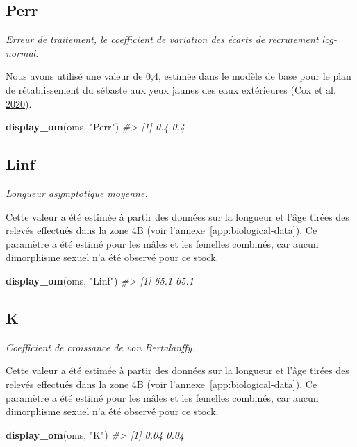\documentclass[11pt]{book}
\newenvironment{Shaded}{\begin{snugshade}}{\end{snugshade}}
\newcommand{\CommentTok}[1]{\textcolor[rgb]{0.56,0.35,0.01}{\textit{#1}}}
\newcommand{\KeywordTok}[1]{\textcolor[rgb]{0.13,0.29,0.53}{\textbf{#1}}}
\newcommand{\NormalTok}[1]{#1}
\newcommand{\StringTok}[1]{\textcolor[rgb]{0.31,0.60,0.02}{#1}}
\begin{document}
\subsection{Perr}

\emph{Erreur de traitement, le coefficient de variation des écarts de recrutement log-normal.}

Nous avons utilisé une valeur de 0,4, estimée dans le modèle de base pour le plan de rétablissement du sébaste aux yeux jaunes des eaux extérieures (Cox et al. \protect\hyperlink{ref-cox2020}{2020}).
\begin{Shaded}
\begin{Highlighting}[]
\KeywordTok{display_om}\NormalTok{(oms, }\StringTok{"Perr"}\NormalTok{)}
\CommentTok{#> [1] 0.4 0.4}
\end{Highlighting}
\end{Shaded}
\label{app:desc-stock-linf-yelloweye}
\subsection{Linf}

\emph{Longueur asymptotique moyenne.}

Cette valeur a été estimée à partir des données sur la longueur et l'âge tirées des relevés effectués dans la zone 4B (voir l'annexe~\ref{app:biological-data}). Ce paramètre a été estimé pour les mâles et les femelles combinés, car aucun dimorphisme sexuel n'a été observé pour ce stock.
\begin{Shaded}
\begin{Highlighting}[]
\KeywordTok{display_om}\NormalTok{(oms, }\StringTok{"Linf"}\NormalTok{)}
\CommentTok{#> [1] 65.1 65.1}
\end{Highlighting}
\end{Shaded}
\label{app:desc-stock-k-yelloweye}
\subsection{K}

\emph{Coefficient de croissance de von Bertalanffy.}

Cette valeur a été estimée à partir des données sur la longueur et l'âge tirées des relevés effectués dans la zone 4B (voir l'annexe~\ref{app:biological-data}). Ce paramètre a été estimé pour les mâles et les femelles combinés, car aucun dimorphisme sexuel n'a été observé pour ce stock.
\begin{Shaded}
\begin{Highlighting}[]
\KeywordTok{display_om}\NormalTok{(oms, }\StringTok{"K"}\NormalTok{)}
\CommentTok{#> [1] 0.04 0.04}
\end{Highlighting}
\end{Shaded}
\label{app:desc-stock-t0-yelloweye}
\end{document}
